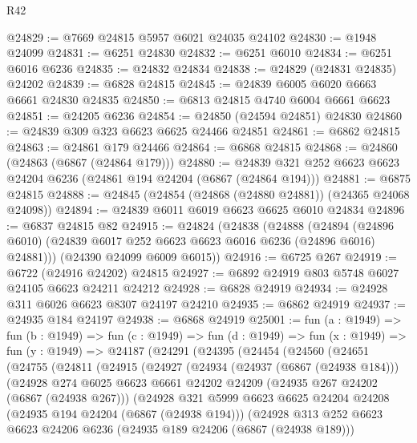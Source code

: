 \begin{lexlean}{R42}
\begin{coremodule}
{@24829 := @7669 @24815 @5957 @6021 @24035 @24102
@24830 := @1948 @24099
@24831 := @6251 @24830
@24832 := @6251 @6010
@24834 := @6251 @6016 @6236
@24835 := @24832 @24834
@24838 := @24829 (@24831 @24835) @24202
@24839 := @6828 @24815
@24845 := @24839 @6005 @6020 @6663 @6661 @24830 @24835
@24850 := @6813 @24815 @4740 @6004 @6661 @6623
@24851 := @24205 @6236
@24854 := @24850 (@24594 @24851) @24830
@24860 := @24839 @309 @323 @6623 @6625 @24466 @24851
@24861 := @6862 @24815
@24863 := @24861 @179 @24466
@24864 := @6868 @24815
@24868 := @24860 (@24863 (@6867 (@24864 @179)))
@24880 := @24839 @321 @252 @6623 @6623 @24204 @6236 (@24861 @194 @24204 (@6867 (@24864 @194)))
@24881 := @6875 @24815
@24888 := @24845 (@24854 (@24868 (@24880 @24881)) (@24365 @24068 @24098))
@24894 := @24839 @6011 @6019 @6623 @6625 @6010 @24834
@24896 := @6837 @24815 @82
@24915 := @24824
    (@24838
      (@24888
        (@24894 (@24896 @6010) (@24839 @6017 @252 @6623 @6623 @6016 @6236 (@24896 @6016) @24881)))
      (@24390 @24099 @6009 @6015))
@24916 := @6725 @267
@24919 := @6722 (@24916 @24202) @24815
@24927 := @6892 @24919 @803 @5748 @6027 @24105 @6623 @24211 @24212
@24928 := @6828 @24919
@24934 := @24928 @311 @6026 @6623 @8307 @24197 @24210
@24935 := @6862 @24919
@24937 := @24935 @184 @24197
@24938 := @6868 @24919
@25001 := fun (a : @1949) =>
  fun (b : @1949) =>
  fun (c : @1949) =>
  fun (d : @1949) =>
  fun (x : @1949) =>
  fun (y : @1949) =>
  @24187
    (@24291
      (@24395
        (@24454
          (@24560
            (@24651
              (@24755
                (@24811
                  (@24915
                    (@24927
                      (@24934
                        (@24937 (@6867 (@24938 @184)))
                        (@24928
                          @274
                          @6025
                          @6623
                          @6661
                          @24202
                          @24209
                          (@24935 @267 @24202 (@6867 (@24938 @267)))
                          (@24928
                            @321
                            @5999
                            @6623
                            @6625
                            @24204
                            @24208
                            (@24935 @194 @24204 (@6867 (@24938 @194)))
                            (@24928
                              @313
                              @252
                              @6623
                              @6623
                              @24206
                              @6236
                              (@24935 @189 @24206 (@6867 (@24938 @189)))
}
\end{coremodule}
\end{lexlean}
